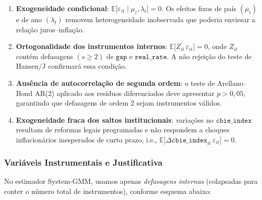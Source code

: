\documentclass[a4paper,12pt]{article}[abnt2]
\begin{document}
\begin{enumerate}
  \item \textbf{Exogeneidade condicional}:\; 
        \(\mathbb{E}\!\bigl[\varepsilon_{it}\mid\mu_i,\lambda_t\bigr]=0\).
        Os efeitos fixos de país \((\mu_i)\) e de ano \((\lambda_t)\) removem
        heterogeneidade inobservada que poderia enviesar a
        relação juros–inflação.

  \item \textbf{Ortogonalidade dos instrumentos internos}:\; 
        \(\mathbb{E}\!\bigl[Z_{it}^{\prime}\,\varepsilon_{it}\bigr]=0\),
        onde \(Z_{it}\) contém defasagens \((s\ge2)\) de
        \(\texttt{gap}\) e \(\texttt{real\_rate}\).
        A não rejeição do teste de Hansen/J confirmará essa condição.

  \item \textbf{Ausência de autocorrelação de segunda ordem}:\;
        o teste de Arellano–Bond AR(2) aplicado aos resíduos diferenciados
        deve apresentar \(p\!>\!0{,}05\), garantindo que defasagens
        de ordem 2 sejam instrumentos válidos.

  \item \textbf{Exogeneidade fraca dos saltos institucionais}:\;
        variações no \(\texttt{cbie\_index}\) resultam de reformas legais
        programadas e não respondem a choques inflacionários
        inesperados de curto prazo, i.e.,
        \(\mathbb{E}\!\bigl[\Delta\texttt{cbie\_index}_{it}\,\varepsilon_{it}\bigr]=0\).
\end{enumerate}


\subsubsection{\textbf{Variáveis Instrumentais e Justificativa}}

No estimador System‑GMM, usamos apenas \emph{defasagens internas}
(colapsadas para conter o número total de instrumentos), conforme esquema
abaixo:
\end{document}
